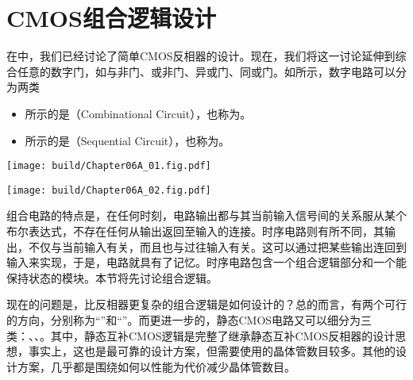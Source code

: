 \chapter{CMOS组合逻辑设计}
在中，我们已经讨论了简单CMOS反相器的设计。现在，我们将这一讨论延伸到综合任意的数字门，如与非门、或非门、异或门、同或门。如所示，数字电路可以分为两类
\begin{itemize}
    \item {}所示的是（Combinational Circuit），也称为。
    \item {}所示的是（Sequential Circuit），也称为。
\end{itemize}

\begin{Figure}[数字电路的高层次分类]
    \begin{FigureSub}[组合电路]
        \texttt{[image: build/Chapter06A\_01.fig.pdf]}
    \end{FigureSub}
    \hspace{1cm}
    \begin{FigureSub}[时序电路]
        \texttt{[image: build/Chapter06A\_02.fig.pdf]}
    \end{FigureSub}
\end{Figure}
组合电路的特点是，在任何时刻，电路输出都与其当前输入信号间的关系服从某个布尔表达式，不存在任何从输出返回至输入的连接。时序电路则有所不同，其输出，不仅与当前输入有关，而且也与过往输入有关。这可以通过把某些输出连回到输入来实现，于是，电路就具有了记忆。时序电路包含一个组合逻辑部分和一个能保持状态的模块。本节将先讨论组合逻辑。

现在的问题是，比反相器更复杂的组合逻辑是如何设计的？总的而言，有两个可行的方向，分别称为“”和“”。而更进一步的，静态CMOS电路又可以细分为三类：、、。其中，静态互补CMOS逻辑是完整了继承静态互补CMOS反相器的设计思想，事实上，这也是最可靠的设计方案，但需要使用的晶体管数目较多。其他的设计方案，几乎都是围绕如何以性能为代价减少晶体管数目。



